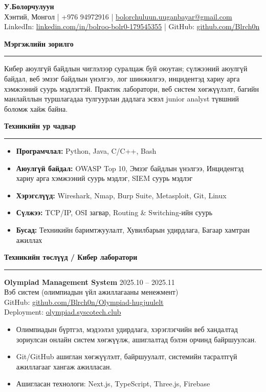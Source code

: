 \documentclass[10pt,a4paper]{article}
\newcommand{\cvsection}[1]{
  \vspace{3pt}
  {\large\textbf{#1}}\\[-4pt]
  \rule{\linewidth}{0.4pt}
}
\begin{document}
\raggedright

{\LARGE \textbf{У.Болорчулуун}}\\
Хэнтий, Монгол \;|\; +976 94972916 \;|\; \href{mailto:bolorchuluun.uuganbayar@gmail.com}{bolorchuluun.uuganbayar@gmail.com}\\
LinkedIn: \href{https://www.linkedin.com/in/bolroo-bolr0-179545355/}{linkedin.com/in/bolroo-bolr0-179545355} \;|\;
GitHub: \href{https://github.com/Blrch0n}{github.com/Blrch0n}

\cvsection{Мэргэжлийн зорилго}
Кибер аюулгүй байдлын чиглэлээр суралцаж буй оюутан; сүлжээний аюулгүй байдал, веб эмзэг байдлын үнэлгээ,
лог шинжилгээ, инцидентэд хариу арга хэмжээний суурь мэдлэгтэй. Практик лаборатори, веб систем хөгжүүлэлт,
багийн манлайллын туршлагадаа тулгуурлан дадлага эсвэл junior analyst түвшний боломж хайж байна.

\cvsection{Техникийн ур чадвар}
\begin{itemize}
  \item \textbf{Програмчлал:} Python, Java, C/C++, Bash
  \item \textbf{Аюулгүй байдал:} OWASP Top 10, Эмзэг байдлын үнэлгээ, Инцидентэд хариу арга хэмжээний суурь мэдлэг, SIEM суурь мэдлэг
  \item \textbf{Хэрэгслүүд:} Wireshark, Nmap, Burp Suite, Metasploit, Git, Linux
  \item \textbf{Сүлжээ:} TCP/IP, OSI загвар, Routing \& Switching-ийн суурь
  \item \textbf{Бусад:} Техникийн баримтжуулалт, Хувилбарын удирдлага, Багаар хамтран ажиллах
\end{itemize}

\cvsection{Техникийн төслүүд / Кибер лаборатори}
\textbf{Olympiad Management System} \hfill 2025.10 -- 2025.11\\
Вэб систем (олимпиадын үйл ажиллагааны менежмент)\\
GitHub: \href{https://github.com/Blrch0n/Olympiad-hugjuulelt}{github.com/Blrch0n/Olympiad-hugjuulelt}\\
Deployment: \href{https://olympiad.syscotech.club/}{olympiad.syscotech.club}\\
\begin{itemize}
  \item Олимпиадын бүртгэл, мэдээлэл удирдлага, хэрэглэгчийн веб хандалтад зориулсан онлайн систем хөгжүүлж, ашиглалтад бэлэн орчинд байршуулсан.
  \item Git/GitHub ашиглан хөгжүүлэлт, байршуулалт, системийн тасралтгүй ажиллагааг хангаж ажилласан.
  \item Ашигласан технологи: Next.js, TypeScript, Three.js, Firebase
\end{itemize}
\end{document}
